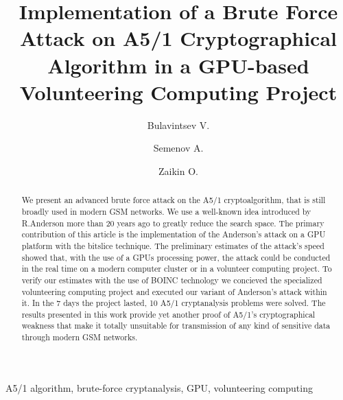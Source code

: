 \documentclass[runningheads,a4paper]{llncs}[2015/06/24]
\begin{document}
\title{Implementation of a Brute Force Attack on A5/1 Cryptographical
Algorithm in a GPU-based Volunteering Computing Project}
{}

\author{Bulavintsev V. \and Semenov A. \and Zaikin O.}

%

			
\maketitle

\begin{abstract}
We present an advanced brute force attack on the A5/1 cryptoalgorithm,
	that is still broadly used in modern GSM networks. We use a
	well-known idea introduced by R.Anderson more than 20 years ago
	to greatly reduce the search space. The primary contribution of
	this article is the implementation of the Anderson's attack on a GPU platform
	with the bitslice technique. The preliminary estimates of the
	attack's speed showed that, with the use of a GPUs processing power, 
	the attack could be conducted in the real
	time on a modern computer cluster or in a volunteer computing
	project. To verify our estimates with the use of BOINC technology 
	we concieved the specialized volunteering computing project 
	and executed our variant of Anderson's attack within it. In the
	7 days the project lasted, 10 A5/1 cryptanalysis problems were
	solved. The results presented in this work provide yet another
	proof of A5/1's cryptographical weakness that make it totally
	unsuitable for transmission of any kind of sensitive data
	through modern GSM networks.

\end{abstract}

\begin{keywords}
A5/1 algorithm, brute-force cryptanalysis, GPU, volunteering computing
\end{keywords}
\end{document}
